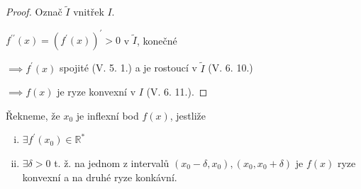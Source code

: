 \begin{proof}
  Označ $\tilde{I}$ vnitřek $I$.

  $f^{\prime\prime}(x) = (f^\prime(x))^\prime >0$ v $\tilde{I}$, konečné

  $\implies f^\prime(x)$ spojité (V. 5. 1.) a je rostoucí v $\tilde{I}$ (V. 6. 10.)

  $\implies f(x)$ je ryze konvexní v $I$ (V. 6. 11.).
\end{proof}

\begin{definice}
  Řekneme, že $x_0$ je inflexní bod $f(x)$, jestliže
  \begin{enumerate}[i.]
    \item $\exists f^\prime(x_0) \in \mathbb R^*$
    \item $\exists \delta >0$ t. ž. na jednom z intervalů $(x_0-\delta, x_0), (x_0, x_0 + \delta)$ je $f(x)$ ryze konvexní a na druhé ryze konkávní.
  \end{enumerate}
\end{definice}
